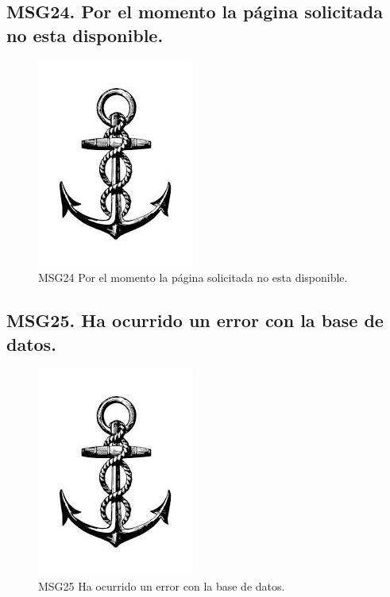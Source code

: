\subsection{MSG24. Por el momento la página solicitada no esta disponible.}
    \begin{figure}[htbp]
        \begin{center}
            \includegraphics[width=.4\textwidth]{images/MSG/ancla}
            \caption{MSG24 Por el momento la página solicitada no esta disponible.}
            \label{fig:MSG24}
        \end{center}
    \end{figure}

\subsection{MSG25. Ha ocurrido un error con la base de datos.}
    \begin{figure}[htbp]
        \begin{center}
            \includegraphics[width=.4\textwidth]{images/MSG/ancla}
            \caption{MSG25 Ha ocurrido un error con la base de datos.}
            \label{fig:MSG25}
        \end{center}
    \end{figure}

